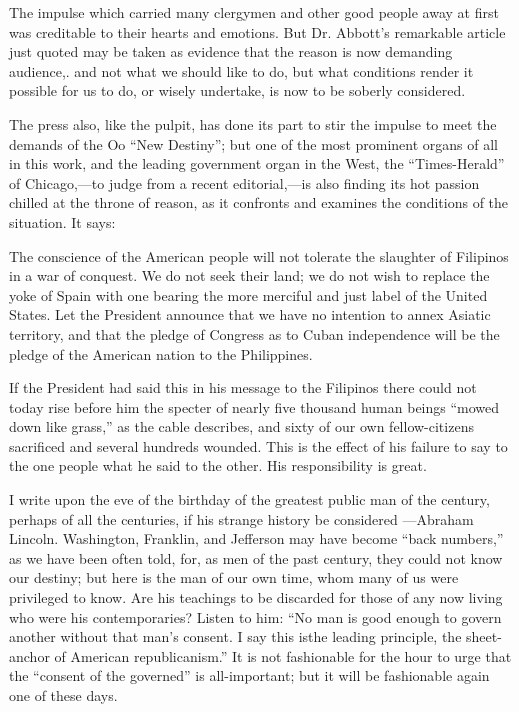 \documentclass[11pt,openany]{book}
\begin{document}
The impulse which carried many clergymen and other good people away at first was creditable to their hearts and emotions. But Dr. Abbott's remarkable article just quoted may be taken as evidence that the reason is now demanding audience,. and not what we should like to do, but what conditions render it possible for us to do, or wisely undertake, is now to be soberly considered.

The press also, like the pulpit, has done its part to stir the impulse to meet the demands of the Oo ``New Destiny''; but one of the most prominent organs of all in this work, and the leading government organ in the West, the ``Times-Herald'' of Chicago,---to judge from a recent editorial,---is also finding its hot passion chilled at the throne of reason, as it confronts and examines the conditions of the situation. It says:

The conscience of the American people will not tolerate the slaughter of Filipinos in a war of conquest. We do not seek their land; we do not wish to replace the yoke of Spain with one bearing the more merciful and just label of the United States. Let the President announce that we have no intention to annex Asiatic territory, and that the pledge of Congress as to Cuban independence will be the pledge of the American nation to the Philippines.

If the President had said this in his message to the Filipinos there could not today rise before him the specter of nearly five thousand human beings ``mowed down like grass,'' as the cable describes, and sixty of our own fellow-citizens sacrificed and several hundreds wounded. This is the effect of his failure to say to the one people what he said to the other. His responsibility is great.

I write upon the eve of the birthday of the greatest public man of the century, perhaps of all the centuries, if his strange history be considered ---Abraham Lincoln. Washington, Franklin, and Jefferson may have become ``back numbers,'' as we have been often told, for, as men of the past century, they could not know our destiny; but here is the man of our own time, whom many of us were privileged to know. Are his teachings to be discarded for those of any now living who were his contemporaries? Listen to him: ``No man is good enough to govern another without that man's consent. I say this isthe leading principle, the sheet-anchor of American republicanism.'' It is not fashionable for the hour to urge that the ``consent of the governed'' is all-important; but it will be fashionable again one of these days.
\end{document}

